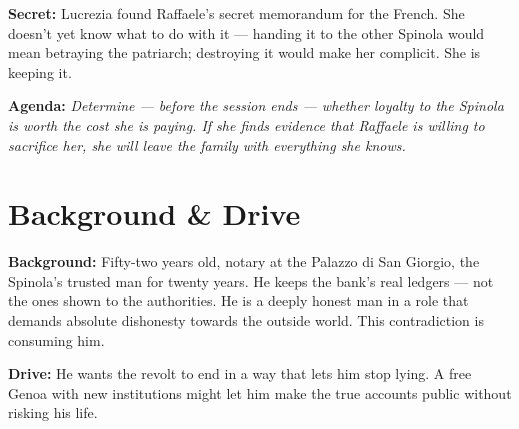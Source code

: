 \clearpage
\begin{secretbox}
\textbf{Secret:} Lucrezia found Raffaele's secret memorandum for the French. She
doesn't yet know what to do with it --- handing it to the other Spinola would mean
betraying the patriarch; destroying it would make her complicit. She is keeping it.

\medskip\noindent\textcolor{SecretRed}{\textbf{Agenda:}} \textit{Determine --- before
the session ends --- whether loyalty to the Spinola is worth the cost she is paying.
If she finds evidence that Raffaele is willing to sacrifice her, she will leave the
family with everything she knows.}
\end{secretbox}

\clearpage


\section*{Background \& Drive}
\begin{rulebox}{}
\textbf{Background:} Fifty-two years old, notary at the Palazzo di San Giorgio, the
Spinola's trusted man for twenty years. He keeps the bank's real ledgers --- not the
ones shown to the authorities. He is a deeply honest man in a role that demands
absolute dishonesty towards the outside world. This contradiction is consuming him.

\medskip\noindent\textcolor{SpinolaRed}{\textbf{Drive:}} He wants the revolt to end
in a way that lets him stop lying. A free Genoa with new institutions might let him
make the true accounts public without risking his life.
\end{rulebox}

